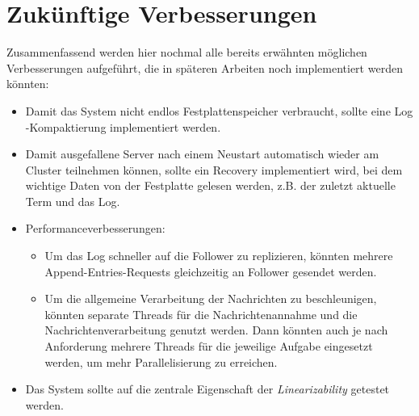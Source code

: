 \section{Zukünftige Verbesserungen}

Zusammenfassend werden hier nochmal alle bereits erwähnten möglichen Verbesserungen aufgeführt, die in späteren Arbeiten noch implementiert werden könnten:

\begin{itemize}
	\item Damit das System nicht endlos Festplattenspeicher verbraucht, sollte eine Log\\-Kompaktierung implementiert werden.
	\item Damit ausgefallene Server nach einem Neustart automatisch wieder am Cluster teilnehmen können, sollte ein Recovery implementiert wird, bei dem wichtige Daten von der Festplatte gelesen werden, z.B. der zuletzt aktuelle Term und das Log.
	\item Performanceverbesserungen: 
		\begin{itemize}
			\item Um das Log schneller auf die Follower zu replizieren, könnten mehrere Append-Entries-Requests gleichzeitig an Follower gesendet werden. 
			\item Um die allgemeine Verarbeitung der Nachrichten zu beschleunigen, könnten separate Threads für die Nachrichtenannahme und die Nachrichtenverarbeitung genutzt werden. Dann könnten auch je nach Anforderung mehrere Threads für die jeweilige Aufgabe eingesetzt werden, um mehr Parallelisierung zu erreichen.
		\end{itemize}
	\item Das System sollte auf die zentrale Eigenschaft der \textit{Linearizability} getestet werden.
\end{itemize}